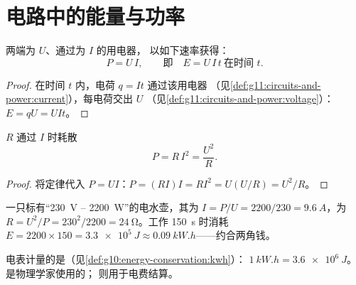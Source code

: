 \section{电路中的能量与功率}

\begin{proposition}[电功率]\label{prop:g11:circuits-and-power:power}
两端为 $U$、通过为 $I$ 的用电器，
以如下速率获得：
\[ P = U\,I , \qquad\text{即}\quad E = U\,I\,t \ \text{在时间 } t . \]
\end{proposition}

\begin{proof}
在时间 $t$ 内，电荷 $q = It$ 通过该用电器
（见\cref{def:g11:circuits-and-power:current}），每电荷交出
$U$ （见\cref{def:g11:circuits-and-power:voltage}）：$E = qU = UIt$。
\end{proof}

\begin{proposition}[电阻的功率]\label{prop:g11:circuits-and-power:ri2}
 $R$ 通过 $I$ 时耗散
\[ P = R\,I^2 = \frac{U^2}{R} . \]
\end{proposition}

\begin{proof}
将定律代入 $P = UI$：$P = (RI)I = RI^2 = U(U/R) = U^2/R$。
\end{proof}

\begin{example}[读取铭牌]\label{ex:g11:circuits-and-power:nameplate}
一只标有“\qty{230}{V} -- \qty{2200}{W}”的电水壶，其为 $I = P/U =
2200/230 = \qty{9.6}{A}$，为 $R = U^2/P = 230^2/2200 =
\qty{24}{\ohm}$。工作 \qty{150}{s} 时消耗 $E = 2200 \times 150 =
\qty{3.3e5}{J} \approx \qty{0.09}{kW.h}$——约合两角钱。
\end{example}

\begin{remark}[焦耳与千瓦时]\label{rem:g11:circuits-and-power:kwh}
电表计量的是（见\cref{def:g10:energy-conservation:kwh}）：
$\qty{1}{kW.h} = \qty{3.6e6}{J}$。是物理学家使用的；
则用于电费结算。
\end{remark}


